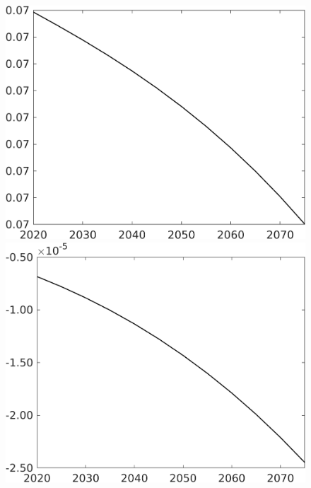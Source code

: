\begin{figure}[h!!]
\begin{minipage}[]{0.32\textwidth}
		\includegraphics[width=1\textwidth]{../../codding_model/own_basedOnFried/optimalPol_010922_revision/figures/all_13Sept22/CompTaufPER_bytaul_Reg0_sg_spillover0_nsk0_xgr0_knspil0_sep0_LFlimit0_emsbase0_countec0_GovRev0_etaa0.79_lgd0.png}
	\end{minipage}
	\begin{minipage}[]{0.32\textwidth}
		\includegraphics[width=1\textwidth]{../../codding_model/own_basedOnFried/optimalPol_010922_revision/figures/all_13Sept22/CompTaufPER_bytaul_Reg0_snS_spillover0_nsk0_xgr0_knspil0_sep0_LFlimit0_emsbase0_countec0_GovRev0_etaa0.79_lgd0.png}

\end{minipage}
\end{figure}
